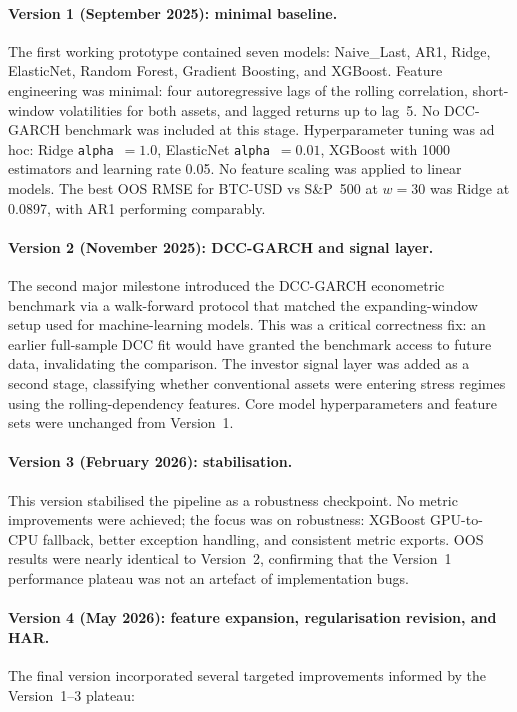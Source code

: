 \paragraph{Version 1 (September 2025): minimal baseline.}
The first working prototype contained seven models: Naive\_Last, AR1, Ridge, ElasticNet,
Random Forest, Gradient Boosting, and XGBoost.
Feature engineering was minimal: four autoregressive lags of the rolling correlation,
short-window volatilities for both assets, and lagged returns up to lag~5.
No DCC-GARCH benchmark was included at this stage.
Hyperparameter tuning was ad hoc: Ridge \texttt{alpha}~$= 1.0$, ElasticNet \texttt{alpha}~$= 0.01$,
XGBoost with 1000 estimators and learning rate 0.05.
No feature scaling was applied to linear models.
The best OOS RMSE for BTC-USD vs S\&P~500 at $w = 30$ was Ridge at 0.0897,
with AR1 performing comparably.

\paragraph{Version 2 (November 2025): DCC-GARCH and signal layer.}
The second major milestone introduced the DCC-GARCH econometric benchmark via a
walk-forward protocol that matched the expanding-window setup used for machine-learning models.
This was a critical correctness fix: an earlier full-sample DCC fit would have granted the
benchmark access to future data, invalidating the comparison.
The investor signal layer was added as a second stage, classifying whether conventional
assets were entering stress regimes using the rolling-dependency features.
Core model hyperparameters and feature sets were unchanged from Version~1.

\paragraph{Version 3 (February 2026): stabilisation.}
This version stabilised the pipeline as a robustness checkpoint.
No metric improvements were achieved; the focus was on robustness:
XGBoost GPU-to-CPU fallback, better exception handling, and consistent metric exports.
OOS results were nearly identical to Version~2, confirming that the Version~1 performance
plateau was not an artefact of implementation bugs.

\paragraph{Version 4 (May 2026): feature expansion, regularisation revision, and HAR.}
The final version incorporated several targeted improvements informed by the
Version~1--3 plateau:

